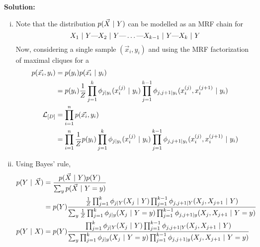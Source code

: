 \textbf{Solution:}

\begin{enumerate}[(i)]
    \item Note that the distribution $p(\vec{X} ~\vert~ Y)$ can be modelled as an MRF chain for $$X_1 ~\vert~ Y \text{---} X_2 ~\vert~ Y \text{---} \dots \text{---} X_{k-1} ~\vert~ Y \text{---} X_{k} ~\vert~ Y $$ 
    Now, considering a single sample $(\vec{x}_i, y_i)$ and using the MRF factorization of maximal cliques for a 
    \begin{align*}
        p(\vec{x_i}, y_i) &= p(y_i) p(\vec{x_i} ~\vert~ y_i) \\
            &= p(y_i) \frac{1}{Z} \prod_{j=1}^k \phi_{j | y_i}(x_i^{(j)} ~\vert~ y_i) \prod_{j=1}^{k-1} \phi_{j,j+1 | y_i}(x_i^{(j)}, x_i^{(j+1)} ~\vert~ y_i)\\
        \mathcal{L}_{[D]} &= \prod_{i=1}^n p(\vec{x_i}, y_i)\\
            &= \prod_{i=1}^n \frac{1}{Z} p(y_i) \prod_{j=1}^k \phi_{j | y_i}(x_i^{(j)} ~\vert~ y_i) \prod_{j=1}^{k-1} \phi_{j,j+1 | y_i}(x_i^{(j)}, x_i^{(j+1)} ~\vert~ y_i)
    \end{align*}
    
    \item Using Bayes' rule,
    \begin{align*}
        p(Y ~\vert~ \vec{X}) &= \frac{p(\vec{X} ~\vert~ Y) p(Y)}{\sum_y p(\vec{X} ~\vert~ Y = y)} \\
            &= p(Y) \frac{\frac{1}{Z}\prod_{j=1}^k \phi_{j | Y}(X_j ~\vert~ Y) \prod_{j=1}^{k-1} \phi_{j,j+1 | Y}(X_j, X_{j+1} ~\vert~ Y)}{\sum_y \frac{1}{Z} \prod_{j=1}^k \phi_{j | y}(X_j ~\vert~ Y = y) \prod_{j=1}^{k-1} \phi_{j,j+1 | y}(X_j, X_{j+1} ~\vert~ Y = y)}\\
        p(Y ~\vert~ X) 
            &= p(Y) \frac{\prod_{j=1}^k \phi_{j | Y}(X_j ~\vert~ Y)         \prod_{j=1}^{k-1} \phi_{j,j+1 | Y}(X_j, X_{j+1} ~\vert~ Y)}{\sum_y \prod_{j=1}^k \phi_{j | y}(X_j ~\vert~ Y = y) \prod_{j=1}^{k-1} \phi_{j,j+1 | y}(X_j, X_{j+1} ~\vert~ Y = y)}
    \end{align*}
    

\end{enumerate}
